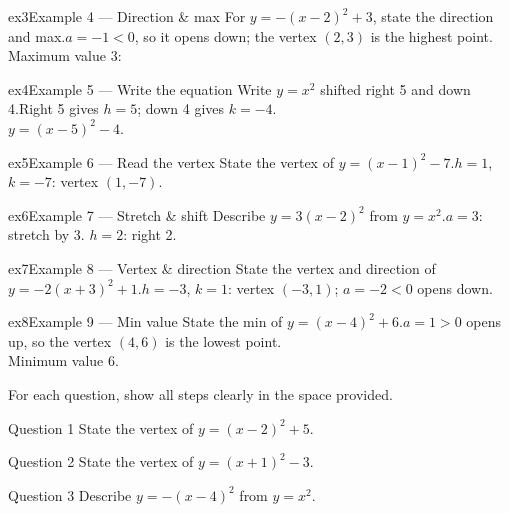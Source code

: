 \documentclass[11pt]{article}
\begin{document}
\begin{example}{ex3}{Example 4 --- Direction \& max}
For $y=-(x-2)^2+3$, state the direction and max.\soln $a=-1<0$, so it opens down; the vertex $(2,3)$ is the highest point. \\ Maximum value $3$:
\end{example}

\begin{example}{ex4}{Example 5 --- Write the equation}
Write $y=x^2$ shifted right 5 and down 4.\soln Right 5 gives $h=5$; down 4 gives $k=-4$. \\ $y=(x-5)^2-4$.
\end{example}

\begin{example}{ex5}{Example 6 --- Read the vertex}
State the vertex of $y=(x-1)^2-7$.\soln $h=1$, $k=-7$: vertex $(1,-7)$.
\end{example}

\begin{example}{ex6}{Example 7 --- Stretch \& shift}
Describe $y=3(x-2)^2$ from $y=x^2$.\soln $a=3$: stretch by 3. $h=2$: right 2.
\end{example}

\begin{example}{ex7}{Example 8 --- Vertex \& direction}
State the vertex and direction of $y=-2(x+3)^2+1$.\soln $h=-3$, $k=1$: vertex $(-3,1)$; $a=-2<0$ opens down.
\end{example}

\begin{example}{ex8}{Example 9 --- Min value}
State the min of $y=(x-4)^2+6$.\soln $a=1>0$ opens up, so the vertex $(4,6)$ is the lowest point. \\ Minimum value $6$.
\end{example}

\clearpage
{}
For each question, show all steps clearly in the space provided.

\begin{qbox}{Question 1}
State the vertex of $y=(x-2)^2+5$.\workspace{2.4cm}
\end{qbox}

\begin{qbox}{Question 2}
State the vertex of $y=(x+1)^2-3$.\workspace{2.4cm}
\end{qbox}

\begin{qbox}{Question 3}
Describe $y=-(x-4)^2$ from $y=x^2$.\workspace{2.4cm}
\end{qbox}
\end{document}
